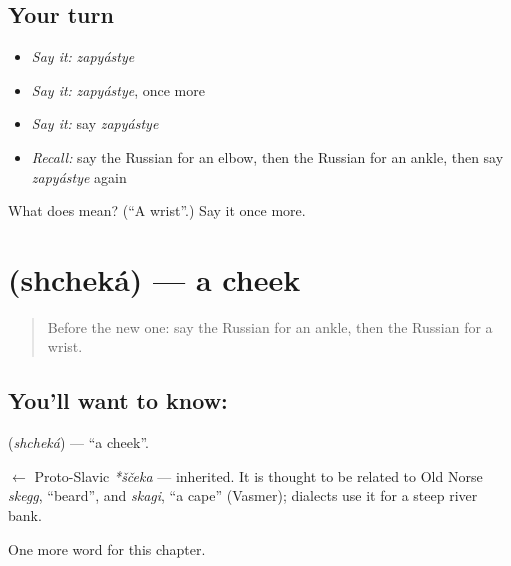 \subsection*{Your turn}
\begin{itemize}
\raggedright
  \item \emph{Say it:} \emph{zapyástye}
  \item \emph{Say it:} \emph{zapyástye}, once more
  \item \emph{Say it:} say \emph{zapyástye}
  \item \emph{Recall:} say the Russian for an elbow, then the Russian for an ankle, then say \emph{zapyástye} again
\end{itemize}

\begin{tcolorbox}[breakable,colback=teal!4,colframe=teal!35!black,title={Before you move on}]
What does  mean? (\textquotedblleft{}A wrist\textquotedblright{}.) Say it once more.
\end{tcolorbox}
\section[\texorpdfstring{\ru{щека} (shcheká)}{щека (shcheká)}]{ (shcheká) — a cheek}

\label{lesson:RU-C119-cheek}



\begin{quote}
Before the new one: say the Russian for an ankle, then the Russian for a wrist.
\end{quote}

\subsection*{You'll want to know: }
\textbf{} (\emph{shcheká}) — \textquotedblleft{}a cheek\textquotedblright{}.

\begin{cousinweb}
\textbf{} $\leftarrow$ Proto-Slavic \emph{*ščeka} — inherited. It is thought to be related to Old Norse \emph{skegg}, \textquotedblleft{}beard\textquotedblright{}, and \emph{skagi}, \textquotedblleft{}a cape\textquotedblright{} (Vasmer); dialects use it for a steep river bank.
\end{cousinweb}

\begin{grammarlens}[title={What you've built}]
One more word for this chapter.
\end{grammarlens}

